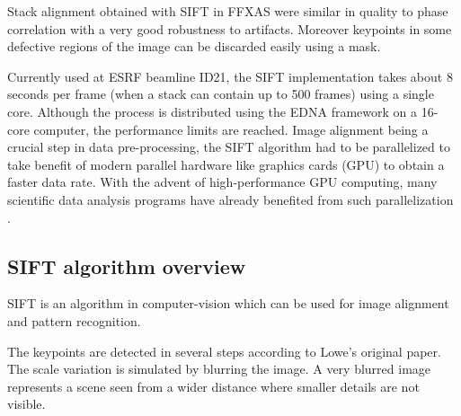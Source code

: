 \documentclass[preprint]{iucr}
\begin{document}
Stack alignment obtained with SIFT in FFXAS were similar in quality to phase
correlation with a very good robustness to artifacts.
Moreover keypoints in some defective regions of the image can be
discarded easily using a mask.

Currently used at ESRF beamline ID21, the SIFT implementation takes about 8
seconds per frame (when a stack can contain up to  500 frames) using a single
core.
Although the process is distributed using the EDNA\cite{edna} framework on a 
16-core computer, the performance limits are reached.
Image alignment being a crucial step in data pre-processing, the SIFT
algorithm had to be parallelized to take benefit of modern parallel
hardware like graphics cards (GPU) to obtain a faster data rate.
With the advent of high-performance GPU computing, many scientific data analysis
programs have already benefited from such parallelization
\cite{pyhst,pyfai,Favre-Nicolin}.

\subsection{SIFT algorithm overview}
SIFT is an algorithm in computer-vision which can be used for image alignment
and pattern recognition.  

The keypoints are detected in several steps according to Lowe's
original paper\cite{Lowe99}.
The scale variation is simulated by blurring the image.
A very blurred image represents a scene seen from a wider distance where
smaller details are not visible.
\end{document}

